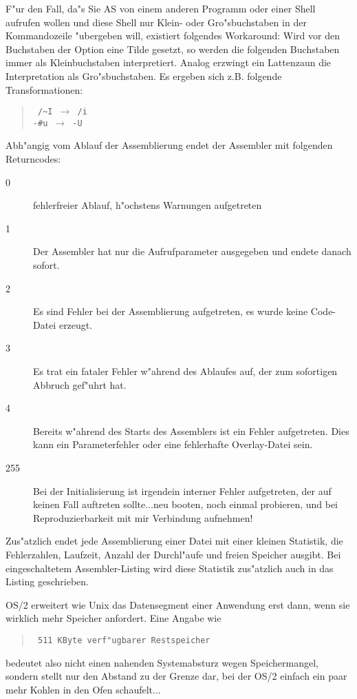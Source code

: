 \documentclass[12pt,a4paper,twoside]{report}
\begin{document}
\par
F"ur den Fall, da"s Sie AS von einem anderen Programm oder einer Shell
aufrufen wollen und diese Shell nur Klein- oder Gro"sbuchstaben in der
Kommandozeile "ubergeben will, existiert folgendes Workaround: Wird vor
den Buchstaben der Option eine Tilde gesetzt, so werden die folgenden
Buchstaben immer als Kleinbuchstaben interpretiert.  Analog erzwingt
ein Lattenzaun die Interpretation als Gro"sbuchstaben.  Es ergeben
sich z.B. folgende Transformationen:
\begin{quote}{\tt
 /\verb!~!I $\longrightarrow$ /i \\
 -\verb!#!u $\longrightarrow$ -U}
\end{quote}
\par
Abh"angig vom Ablauf der Assemblierung endet der Assembler mit
folgenden Returncodes:
\begin{description}
\item[0]{fehlerfreier Ablauf, h"ochstens Warnungen aufgetreten}
\item[1]{Der Assembler hat nur die Aufrufparameter ausgegeben und
         endete danach sofort.}
\item[2]{Es sind Fehler bei der Assemblierung aufgetreten, es wurde
         keine Code-Datei erzeugt.}
\item[3]{Es trat ein fataler Fehler w"ahrend des Ablaufes auf, der
         zum sofortigen Abbruch gef"uhrt hat.}
\item[4]{Bereits w"ahrend des Starts des Assemblers ist ein Fehler
         aufgetreten.  Dies kann ein Parameterfehler oder eine fehlerhafte
         Overlay-Datei sein.}
\item[255]{Bei der Initialisierung ist irgendein interner Fehler
         aufgetreten, der auf keinen Fall auftreten sollte...neu booten,
         noch einmal probieren, und bei Reproduzierbarkeit mit mir
         Verbindung aufnehmen!}
\end{description}

Zus"atzlich endet jede Assemblierung einer Datei mit einer kleinen
Statistik, die Fehlerzahlen, Laufzeit, Anzahl der Durchl"aufe und freien
Speicher ausgibt.  Bei eingeschaltetem Assembler-Listing wird diese
Statistik zus"atzlich auch in das Listing geschrieben.

OS/2  erweitert wie Unix das Datensegment einer
Anwendung erst dann, wenn sie wirklich mehr Speicher anfordert.  Eine
Angabe wie
\begin{quote}{\tt
511 KByte verf"ugbarer Restspeicher
}\end{quote}
bedeutet also nicht einen nahenden Systemabsturz wegen Speichermangel,
sondern stellt nur den Abstand zu der Grenze dar, bei der OS/2 einfach
ein paar mehr Kohlen in den Ofen schaufelt...
\end{document}
